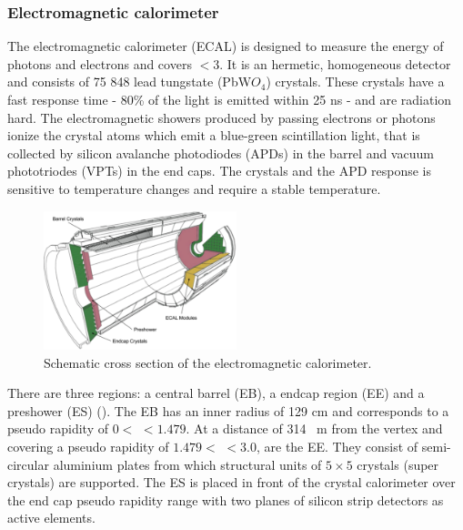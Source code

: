 \subsubsection{Electromagnetic calorimeter}
The electromagnetic calorimeter (ECAL) is designed to measure the energy of photons and electrons and covers \abspsrap $<3$. It is an hermetic, homogeneous detector and consists of 75 848 lead tungstate (PbW$O_4$) crystals. These crystals have a fast response time - 80\% of the light is emitted within 25 \si{ \nano \second} - and are radiation hard. The electromagnetic showers produced by passing electrons or photons ionize the crystal atoms which emit a blue-green scintillation light, that is collected by silicon avalanche photodiodes (APDs) in the barrel and vacuum phototriodes (VPTs) in the end caps. The crystals and the APD response is sensitive to temperature changes and require a stable temperature. 

\begin{figure}[ht]
	\centering
	\includegraphics[width=0.5\textwidth]{2_ExperimentalSetup/Figures/imageedit_5_8264930617}
	\caption{Schematic cross section of the electromagnetic calorimeter\cite{Chatrchyan:2008aa}.}
	\label{fig:ECAL}
\end{figure}
There are three regions: a central barrel (EB), a endcap region (EE) and a preshower (ES) (). 
The EB has an inner radius of 129 \si{ \centi \meter} and corresponds to a pseudo rapidity of $0 < $ \abspsrap $<1.479$. At a distance of 314 \si{ \cent \meter} from the vertex and covering a pseudo rapidity of $1.479 < $ \abspsrap $<3.0$, are the EE. They consist of semi-circular aluminium plates from which structural units of $5\times5$ crystals (super crystals) are supported. The ES is placed in front of the crystal calorimeter over the end cap pseudo rapidity range with two planes of silicon strip detectors as active elements. 

